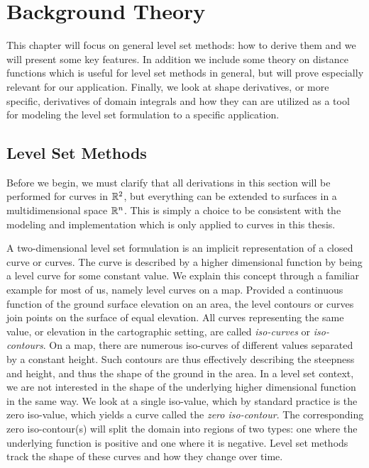 \chapter{Background Theory} \label{chap:background-theory}
This chapter will focus on general level set methods: how to derive them and we will present some key features. In addition we include some theory on distance functions which is useful for level set methods in general, but will prove especially relevant for our application. Finally, we look at shape derivatives, or more specific, derivatives of domain integrals and how they can are utilized as a tool for modeling the level set formulation to a specific application.


\section{Level Set Methods}\label{sec:levelset-methods}
Before we begin, we must clarify that all derivations in this section will be performed for curves in $\mathbb{R}^2$, but everything can be extended to surfaces in a multidimensional space $\mathbb{R}^n$. This is simply a choice to be consistent with the modeling and implementation which is only applied to curves in this thesis.

A two-dimensional level set formulation is an implicit representation of a closed curve or curves. The curve is described by a higher dimensional function by being a level curve for some constant value. We explain this concept through a familiar example for most of us, namely level curves on a map. Provided a continuous function of the ground surface elevation on an area, the level contours or curves join points on the surface of equal elevation. All curves representing the same value, or elevation in the cartographic setting, are called \textit{iso-curves} or \textit{iso-contours}. On a map, there are numerous iso-curves of different values separated by a constant height. Such contours are thus effectively describing the steepness and height, and thus the shape of the ground in the area. In a level set context, we are not interested in the shape of the underlying higher dimensional function in the same way. We look at a single iso-value, which by standard practice is the zero iso-value, which yields a curve called the \textit{zero iso-contour}. The corresponding zero iso-contour(s) will split the domain into regions of two types: one where the underlying function is positive and one where it is negative. Level set methods track the shape of these curves and how they change over time. 


